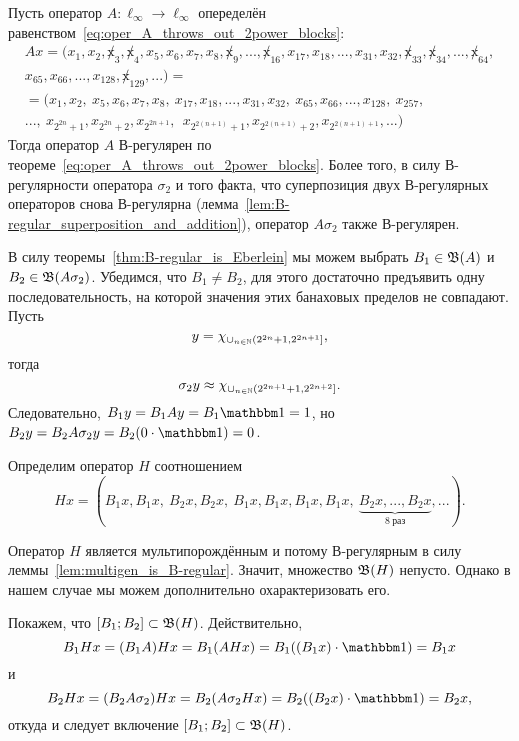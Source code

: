 \begin{example}
	\label{ex:multigen_invariant_interval}
	Пусть оператор $A:\ell_\infty\to\ell_\infty$
	опеределён равенством~\eqref{eq:oper_A_throws_out_2power_blocks}:
	\begin{multline}
		Ax = (x_1, x_2, \not x_3, \not x_4, x_5, x_6, x_7, x_8, \not x_9, ..., \not x_{16}, x_{17}, x_{18}, ..., x_{31}, x_{32}, \not x_{33}, \not x_{34}, ..., \not x_{64},
		\\
		x_{65}, x_{66}, ..., x_{128}, \not x_{129}, ...)=
		\\=
		(x_1, x_2, \ x_5, x_6, x_7, x_8, \ x_{17}, x_{18}, ..., x_{31}, x_{32}, \ x_{65}, x_{66}, ..., x_{128}, \ x_{257},
		\\
		..., \ x_{2^{2n} +1}, x_{2^{2n} +2},  x_{2^{2n+1}}, \ \ x_{2^{2(n+1)} +1},  x_{2^{2(n+1)} +2},  x_{2^{2(n+1)+1}}, ...)
	\end{multline}
	Тогда оператор $A$ В-регулярен по теореме~\ref{eq:oper_A_throws_out_2power_blocks}.
	Более того, в силу В-регулярности оператора $\sigma_2$ и того факта,
	что суперпозиция двух В-регулярных операторов снова В-регулярна (лемма~\ref{lem:B-regular_superposition_and_addition}),
	оператор $A\sigma_2$ также В-регулярен.

	В силу теоремы~\ref{thm:B-regular_is_Eberlein} мы можем выбрать $B_1 \in \mathfrak{B} (A)$ и $B_2 \in \mathfrak{B}(A\sigma_2)$.
	Убедимся, что $B_1 \ne B_2$, для этого достаточно предъявить одну последовательность, на которой
	значения этих банаховых пределов не совпадают.
	Пусть
	\begin{equation}
		y = \chi_{\cup_{n\in\mathbb{N}}(2^{2n}+1, 2^{2n+1}]}
		,
	\end{equation}
	тогда
	\begin{equation}
		\sigma_2 y \approx \chi_{\cup_{n\in\mathbb{N}}(2^{2n+1}+1, 2^{2n+2}]}
		.
	\end{equation}
	Следовательно, $B_1y = B_1Ay = B_1\one = 1$, но $B_2y = B_2A\sigma_2 y = B_2(0\cdot \one) = 0$.

	Определим оператор $H$ соотношением
	\begin{equation}
		Hx = (B_1 x, B_1 x, \ B_2 x, B_2 x, \ B_1 x, B_1 x, B_1 x, B_1 x, \ \underbrace{B_2 x, ..., B_2 x}_{8~\mbox{раз}}, ...)
		.
	\end{equation}

	Оператор $H$ является мультипорождённым и потому В-регулярным в силу леммы~\ref{lem:multigen_is_B-regular}.
	Значит, множество $\mathfrak{B}(H)$ непусто.
	Однако в нашем случае мы можем дополнительно охарактеризовать его.

	Покажем, что $[B_1; B_2]\subset \mathfrak{B}(H)$.
	Действительно,
	\begin{equation}
		B_1 Hx  = (B_1 A) Hx = B_1 (AHx)  = B_1 ((B_1 x) \cdot \one) = B_1 x
	\end{equation}
	и
	\begin{equation}
		B_2 Hx  = (B_2 A\sigma_2) Hx = B_2 (A\sigma_2 Hx)  = B_2 ((B_2 x) \cdot \one) = B_2 x
		,
	\end{equation}
	откуда и следует включение $[B_1; B_2]\subset \mathfrak{B}(H)$.
\end{example}


